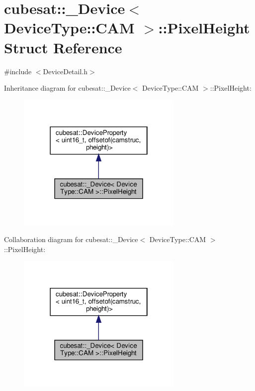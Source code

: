 \hypertarget{structcubesat_1_1__Device_3_01DeviceType_1_1CAM_01_4_1_1PixelHeight}{}\section{cubesat\+:\+:\+\_\+\+Device$<$ Device\+Type\+:\+:C\+AM $>$\+:\+:Pixel\+Height Struct Reference}
\label{structcubesat_1_1__Device_3_01DeviceType_1_1CAM_01_4_1_1PixelHeight}


{\ttfamily \#include $<$Device\+Detail.\+h$>$}



Inheritance diagram for cubesat\+:\+:\+\_\+\+Device$<$ Device\+Type\+:\+:C\+AM $>$\+:\+:Pixel\+Height\+:\nopagebreak
\begin{figure}[H]
\begin{center}
\leavevmode
\includegraphics[width=226pt]{structcubesat_1_1__Device_3_01DeviceType_1_1CAM_01_4_1_1PixelHeight__inherit__graph}
\end{center}
\end{figure}


Collaboration diagram for cubesat\+:\+:\+\_\+\+Device$<$ Device\+Type\+:\+:C\+AM $>$\+:\+:Pixel\+Height\+:\nopagebreak
\begin{figure}[H]
\begin{center}
\leavevmode
\includegraphics[width=226pt]{structcubesat_1_1__Device_3_01DeviceType_1_1CAM_01_4_1_1PixelHeight__coll__graph}
\end{center}
\end{figure}

